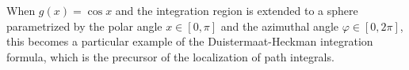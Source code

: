 When $g(x)=\cos x$ and the integration region is extended to a sphere 
parametrized by the polar angle $ x\in [0,\pi]$ and the azimuthal angle $\varphi \in [0, 2\pi]$,
this becomes a particular example of the Duistermaat-Heckman integration formula,
which is the precursor of the localization of path integrals.







